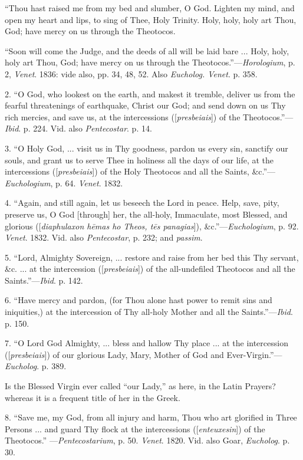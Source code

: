 ``Thou hast raised me from my bed and slumber, O God. Lighten my
mind, and open my heart and lips, to sing of Thee, Holy Trinity. Holy,
holy, holy art Thou, God; have mercy on us through the Theotocos.


``Soon will come the Judge, and the deeds of all will be laid
bare ... Holy, holy, holy art Thou, God; have mercy on us through the
Theotocos.''—\emph{Horologium}, p. 2, \emph{Venet}. 1836: vide
also, pp. 34, 48, 52. Also \emph{Eucholog. Venet}. p. 358.


2. ``O God, who lookest on the earth, and makest it tremble,
deliver us from the fearful threatenings of earthquake, Christ our God;
and send down on us Thy rich mercies, and save us, at the intercessions
([\emph{presbeiais}]) of the Theotocos.''—\emph{Ibid}. p.
224. Vid. also \emph{Pentecostar}. p. 14.


3. ``O Holy God, ... visit us in Thy goodness, pardon us every
sin, sanctify our souls, and grant us to serve Thee in holiness all the
days of our life, at the intercessions ([\emph{presbeiais}]) of the Holy
Theotocos and all the Saints, \&c.''—\emph{Euchologium}, p. 64.
\emph{Venet}. 1832.


4. ``Again, and still again, let us beseech the Lord in peace.
Help, save, pity, preserve us, O God [through] her, the all-holy,
Immaculate, most Blessed, and glorious ([\emph{diaphulaxon h\={e}mas ho
Theos, t\={e}s panagias}]), \&c.''—\emph{Euchologium}, p.
92. \emph{Venet}. 1832. Vid. also \emph{Pentecostar}, p. 232; and \emph{passim}.


5. ``Lord, Almighty Sovereign, ... restore and raise from her bed
this Thy servant, \&c. ... at the intercession ([\emph{presbeiais}])
of the all-undefiled Theotocos and all the Saints.''—\emph{Ibid}.
p. 142.


6. ``Have mercy and pardon, (for Thou alone hast power to remit
sins and iniquities,) at the intercession of Thy all-holy Mother and all
the Saints.''—\emph{Ibid}. p. 150.


7. ``O Lord God Almighty, ... bless and hallow Thy place ... at
the intercession ([\emph{presbeiais}]) of our glorious Lady, Mary,
Mother of God and Ever-Virgin.''—\emph{Eucholog}. p. 389.


Is the Blessed Virgin ever called ``our Lady,'' as here, in
the Latin Prayers? whereas it is a frequent title of her in the Greek.


8. ``Save me, my God, from all injury and harm, Thou who art
glorified in Three Persons ... and guard Thy flock at the intercessions
([\emph{enteuxesin}]) of the Theotocos.'' —\emph{Pentecostarium},
p. 50. \emph{Venet}. 1820. Vid. also Goar, \emph{Eucholog}. p. 30.


